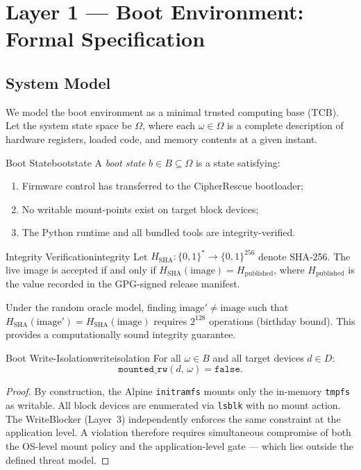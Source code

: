 \documentclass[11pt,a4paper]{report}
\begin{document}
\chapter{Layer 1 --- Boot Environment: Formal Specification}

\section{System Model}

We model the boot environment as a minimal trusted computing base (TCB). Let the system state space be $\Omega$, where each $\omega \in \Omega$ is a complete description of hardware registers, loaded code, and memory contents at a given instant.

\begin{definition}{Boot State}{bootstate}
A \emph{boot state} $b \in B \subseteq \Omega$ is a state satisfying:
\begin{enumerate}[label=(\roman*)]
  \item Firmware control has transferred to the CipherRescue bootloader;
  \item No writable mount-points exist on target block devices;
  \item The Python runtime and all bundled tools are integrity-verified.
\end{enumerate}
\end{definition}

\begin{definition}{Integrity Verification}{integrity}
Let $H_{\mathrm{SHA}} : \{0,1\}^* \to \{0,1\}^{256}$ denote SHA-256. The live image is accepted if and only if $H_{\mathrm{SHA}}(\text{image}) = H_{\mathrm{published}}$, where $H_{\mathrm{published}}$ is the value recorded in the GPG-signed release manifest.
\end{definition}

Under the random oracle model, finding $\text{image}' \neq \text{image}$ such that $H_{\mathrm{SHA}}(\text{image}') = H_{\mathrm{SHA}}(\text{image})$ requires $2^{128}$ operations (birthday bound). This provides a computationally sound integrity guarantee.

\begin{theorem}{Boot Write-Isolation}{writeisolation}
For all $\omega \in B$ and all target devices $d \in D$:
\[
  \mathtt{mounted\_rw}(d,\, \omega) = \mathtt{false}.
\]
\end{theorem}

\begin{proof}
By construction, the Alpine \texttt{initramfs} mounts only the in-memory \texttt{tmpfs} as writable. All block devices are enumerated via \texttt{lsblk} with no mount action. The WriteBlocker (Layer~3) independently enforces the same constraint at the application level. A violation therefore requires simultaneous compromise of both the OS-level mount policy and the application-level gate --- which lies outside the defined threat model.
\end{proof}
\end{document}
